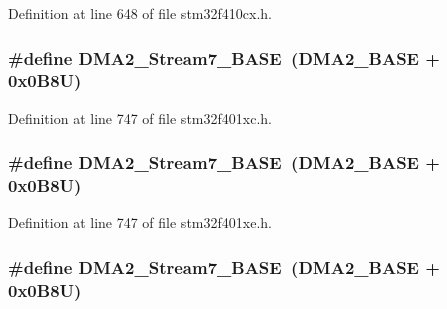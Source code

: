 Definition at line 648 of file stm32f410cx.\+h.

\subsubsection[{\texorpdfstring{D\+M\+A2\+\_\+\+Stream7\+\_\+\+B\+A\+SE}{DMA2_Stream7_BASE}}]{\setlength{\rightskip}{0pt plus 5cm}\#define D\+M\+A2\+\_\+\+Stream7\+\_\+\+B\+A\+SE~({\bf D\+M\+A2\+\_\+\+B\+A\+SE} + 0x0\+B8\+U)}\hypertarget{group___peripheral__registers__structures_gaa9faa708ad2440d24eb1064cba9bb06d}{}\label{group___peripheral__registers__structures_gaa9faa708ad2440d24eb1064cba9bb06d}


Definition at line 747 of file stm32f401xc.\+h.

\subsubsection[{\texorpdfstring{D\+M\+A2\+\_\+\+Stream7\+\_\+\+B\+A\+SE}{DMA2_Stream7_BASE}}]{\setlength{\rightskip}{0pt plus 5cm}\#define D\+M\+A2\+\_\+\+Stream7\+\_\+\+B\+A\+SE~({\bf D\+M\+A2\+\_\+\+B\+A\+SE} + 0x0\+B8\+U)}\hypertarget{group___peripheral__registers__structures_gaa9faa708ad2440d24eb1064cba9bb06d}{}\label{group___peripheral__registers__structures_gaa9faa708ad2440d24eb1064cba9bb06d}


Definition at line 747 of file stm32f401xe.\+h.

\subsubsection[{\texorpdfstring{D\+M\+A2\+\_\+\+Stream7\+\_\+\+B\+A\+SE}{DMA2_Stream7_BASE}}]{\setlength{\rightskip}{0pt plus 5cm}\#define D\+M\+A2\+\_\+\+Stream7\+\_\+\+B\+A\+SE~({\bf D\+M\+A2\+\_\+\+B\+A\+SE} + 0x0\+B8\+U)}\hypertarget{group___peripheral__registers__structures_gaa9faa708ad2440d24eb1064cba9bb06d}{}\label{group___peripheral__registers__structures_gaa9faa708ad2440d24eb1064cba9bb06d}


